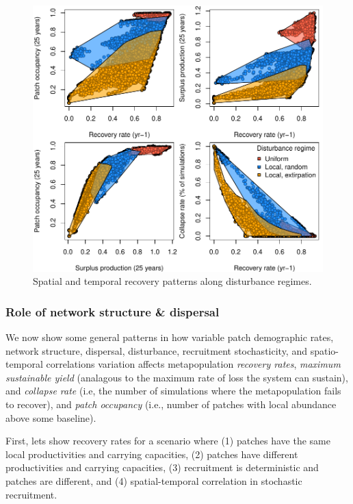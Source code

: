 \documentclass[]{article}
\begin{document}
\begin{figure}[H]

{\centering \includegraphics{Managing_for_ecological_surprises_in_metapopulations_files/figure-latex/disturbance regime-1} 

}

\caption{Spatial and temporal recovery patterns along disturbance regimes.}\label{fig:disturbance regime}
\end{figure}

\hypertarget{role-of-network-structure-dispersal}{%
\subsubsection{Role of network structure \&
dispersal}\label{role-of-network-structure-dispersal}}

We now show some general patterns in how variable patch demographic
rates, network structure, dispersal, disturbance, recruitment
stochasticity, and spatio-temporal correlations variation affects
metapopulation \emph{recovery rates}, \emph{maximum sustainable yield}
(analagous to the maximum rate of loss the system can sustain), and
\emph{collapse rate} (i.e, the number of simulations where the
metapopulation fails to recover), and \emph{patch occupancy} (i.e.,
number of patches with local abundance above some baseline).

First, lets show recovery rates for a scenario where (1) patches have
the same local productivities and carrying capacities, (2) patches have
different productivities and carrying capacities, (3) recruitment is
deterministic and patches are different, and (4) spatial-temporal
correlation in stochastic recruitment.
\end{document}
